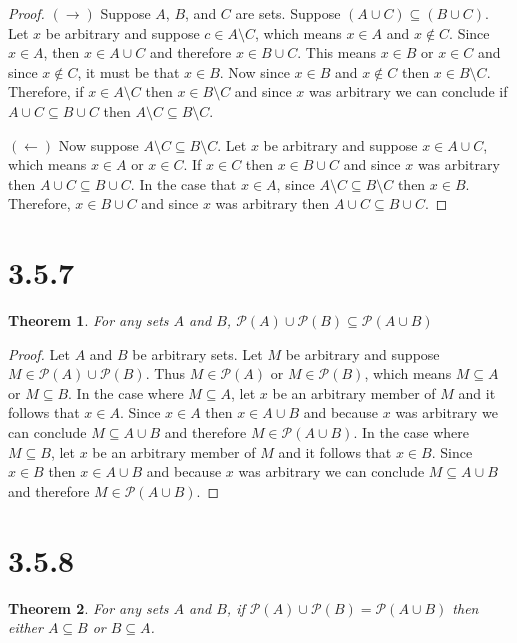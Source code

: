 \documentclass{article}
\newcommand{\pwset}{\mathscr{P}}
\newtheorem*{theorem}{Theorem}  %
\begin{document}
\begin{proof}
$(\rightarrow)$ Suppose $A$, $B$, and $C$ are sets. Suppose $(A \cup C) \subseteq (B \cup C)$. Let $x$ be arbitrary and suppose $c \in A \setminus C$, which means $x \in A$ and $x \notin C$. Since $x \in A$, then $x \in A \cup C$ and therefore $x \in B \cup C$. This means $x \in B$ or $x \in C$ and since $x \notin C$, it must be that $x \in B$. Now since $x \in B$ and $x \notin C$ then $x \in B \setminus C$. Therefore, if $x \in A \setminus C$ then $x \in B \setminus C$ and since $x$ was arbitrary we can conclude if $A \cup C \subseteq B \cup C$ then $A \setminus C \subseteq B \setminus C$.

$(\leftarrow)$ Now suppose $A \setminus C \subseteq B \setminus C$. Let $x$ be arbitrary and suppose $x \in A \cup C$, which means $x \in A$ or $x \in C$. If $x \in C$ then $x \in B \cup C$ and since $x$ was arbitrary then $A \cup C \subseteq B \cup C$. In the case that $x \in A$, since $A \setminus C \subseteq B \setminus C$ then $x \in B$. Therefore, $x \in B \cup C$ and since $x$ was arbitrary then $A \cup C \subseteq B \cup C$.  
\end{proof}

\section*{3.5.7}
\begin{theorem} For any sets $A$ and $B$, $\pwset (A) \cup \pwset (B) \subseteq \pwset (A \cup B)$
\end{theorem}

\begin{proof}
Let $A$ and $B$ be arbitrary sets. Let $M$ be arbitrary and suppose $M \in \pwset (A) \cup \pwset (B)$. Thus $M \in \pwset (A)$ or $M \in \pwset (B)$, which means $M \subseteq A$ or $M \subseteq B$. In the case where $M \subseteq A$, let $x$ be an arbitrary member of $M$ and it follows that $x \in A$. Since $x \in A$ then $x \in A \cup B$ and because $x$ was arbitrary we can conclude $M \subseteq A \cup B$ and therefore $M \in \pwset (A \cup B)$. In the case where $M \subseteq B$, let $x$ be an arbitrary member of $M$ and it follows that $x \in B$. Since $x \in B$ then $x \in A \cup B$ and because $x$ was arbitrary we can conclude $M \subseteq A \cup B$ and therefore $M \in \pwset (A \cup B)$.
\end{proof}

\section*{3.5.8}
\begin{theorem} For any sets $A$ and $B$, if $\pwset (A) \cup \pwset (B) = \pwset (A \cup B)$ then either $A \subseteq B$ or $B \subseteq A$.
\end{theorem}
\end{document}

